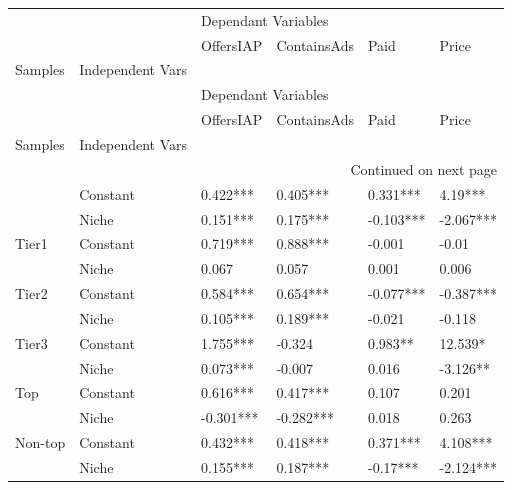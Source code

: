 \begin{longtable}[h!]{llllll}
\toprule
        &       & \multicolumn{4}{l}{Dependant Variables} \\
        &       &           OffersIAP & ContainsAds &       Paid &      Price \\
Samples & Independent Vars &                     &             &            &            \\
\midrule
\endfirsthead

\toprule
        &       & \multicolumn{4}{l}{Dependant Variables} \\
        &       &           OffersIAP & ContainsAds &       Paid &      Price \\
Samples & Independent Vars &                     &             &            &            \\
\midrule
\endhead
\midrule
\multicolumn{6}{r}{{Continued on next page}} \\
\midrule
\endfoot

\bottomrule
\endlastfoot
\multirow{2}{*}{Full} & Constant &            0.422*** &    0.405*** &   0.331*** &    4.19*** \\
        & Niche &            0.151*** &    0.175*** &  -0.103*** &  -2.067*** \\
\cline{1-6}
\multirow{2}{*}{Tier1} & Constant &            0.719*** &    0.888*** &     -0.001 &      -0.01 \\
        & Niche &               0.067 &       0.057 &      0.001 &      0.006 \\
\cline{1-6}
\multirow{2}{*}{Tier2} & Constant &            0.584*** &    0.654*** &  -0.077*** &  -0.387*** \\
        & Niche &            0.105*** &    0.189*** &     -0.021 &     -0.118 \\
\cline{1-6}
\multirow{2}{*}{Tier3} & Constant &            1.755*** &      -0.324 &    0.983** &    12.539* \\
        & Niche &            0.073*** &      -0.007 &      0.016 &   -3.126** \\
\cline{1-6}
\multirow{2}{*}{Top} & Constant &            0.616*** &    0.417*** &      0.107 &      0.201 \\
        & Niche &           -0.301*** &   -0.282*** &      0.018 &      0.263 \\
\cline{1-6}
\multirow{2}{*}{Non-top} & Constant &            0.432*** &    0.418*** &   0.371*** &   4.108*** \\
        & Niche &            0.155*** &    0.187*** &   -0.17*** &  -2.124*** \\
\end{longtable}
